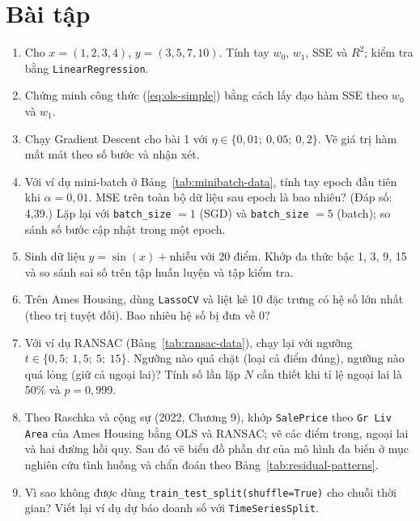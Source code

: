 \section{Bài tập}
\begin{enumerate}
    \item Cho $x = (1, 2, 3, 4)$, $y = (3, 5, 7, 10)$. Tính tay $w_0$, $w_1$, SSE và $R^2$; kiểm tra bằng \texttt{LinearRegression}.
    \item Chứng minh công thức (\ref{eq:ols-simple}) bằng cách lấy đạo hàm SSE theo $w_0$ và $w_1$.
    \item Chạy Gradient Descent cho bài 1 với $\eta \in \{0{,}01;\ 0{,}05;\ 0{,}2\}$. Vẽ giá trị hàm mất mát theo số bước và nhận xét.
    \item Với ví dụ mini-batch ở Bảng~\ref{tab:minibatch-data}, tính tay epoch đầu tiên khi $\alpha = 0{,}01$. MSE trên toàn bộ dữ liệu sau epoch là bao nhiêu? (Đáp số: 4,39.) Lặp lại với \texttt{batch\_size} $= 1$ (SGD) và \texttt{batch\_size} $= 5$ (batch); so sánh số bước cập nhật trong một epoch.
    \item Sinh dữ liệu $y = \sin(x) + \text{nhiễu}$ với 20 điểm. Khớp đa thức bậc 1, 3, 9, 15 và so sánh sai số trên tập huấn luyện và tập kiểm tra.
    \item Trên Ames Housing, dùng \texttt{LassoCV} và liệt kê 10 đặc trưng có hệ số lớn nhất (theo trị tuyệt đối). Bao nhiêu hệ số bị đưa về 0?
    \item Với ví dụ RANSAC (Bảng~\ref{tab:ransac-data}), chạy lại với ngưỡng $t \in \{0{,}5;\ 1{,}5;\ 5;\ 15\}$. Ngưỡng nào quá chặt (loại cả điểm đúng), ngưỡng nào quá lỏng (giữ cả ngoại lai)? Tính số lần lặp $N$ cần thiết khi tỉ lệ ngoại lai là 50\% và $p = 0{,}999$.
    \item Theo Raschka và cộng sự (2022, Chương 9), khớp \texttt{SalePrice} theo \texttt{Gr Liv Area} của Ames Housing bằng OLS và RANSAC; vẽ các điểm trong, ngoại lai và hai đường hồi quy. Sau đó vẽ biểu đồ phần dư của mô hình đa biến ở mục nghiên cứu tình huống và chẩn đoán theo Bảng~\ref{tab:residual-patterns}.
    \item Vì sao không được dùng \texttt{train\_test\_split(shuffle=True)} cho chuỗi thời gian? Viết lại ví dụ dự báo doanh số với \texttt{TimeSeriesSplit}.
\end{enumerate}

